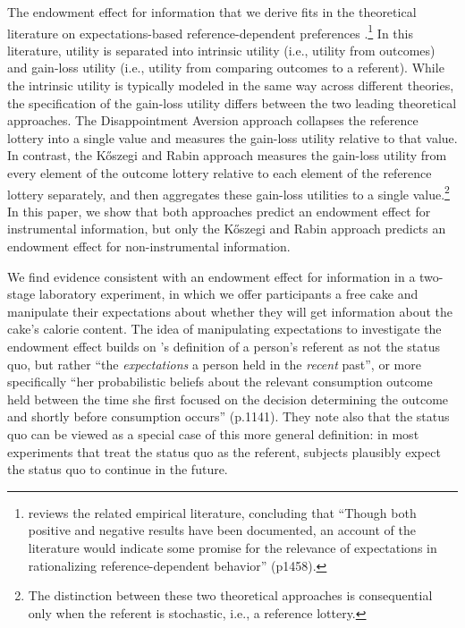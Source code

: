 The endowment effect for information that we derive fits in the theoretical literature on expectations-based reference-dependent preferences \citep{marzilliericsonEndowmentEffect2014,odonoghueChapterReferenceDependentPreferences2018}.\footnote{\citet{sprengerEndowmentEffectRisk2015} reviews the related empirical literature, concluding that \enquote{Though both positive and negative results have been documented, an account of the literature would indicate some promise for the relevance of expectations in rationalizing reference-dependent behavior} (p1458).} In this literature, utility is separated into intrinsic utility (i.e., utility from outcomes) and gain-loss utility (i.e., utility from comparing outcomes to a referent). While the intrinsic utility is typically modeled in the same way across different theories, the specification of the gain-loss utility differs between the two leading theoretical approaches. The Disappointment Aversion approach \citep{bellDisappointmentDecisionMaking1985,loomesDisappointmentDynamicConsistency1986,gulTheoryDisappointmentAversion1991} collapses the reference lottery into a single value and measures the gain-loss utility relative to that value. In contrast, the  Kőszegi and Rabin approach \citep{koszegiModelReferenceDependentPreferences2006,koszegiReferenceDependentRiskAttitudes2007} measures the gain-loss utility from every element of the outcome lottery relative to each element of the reference lottery separately, and then aggregates these gain-loss utilities to a single value.\footnote{The distinction between these two theoretical approaches is consequential only when the referent is stochastic, i.e., a reference lottery.}  In this paper, we show that both approaches predict an endowment effect for instrumental information, but only the Kőszegi and Rabin approach predicts an endowment effect for non-instrumental information.

We find evidence consistent with an endowment effect for information in a two-stage laboratory experiment, in which we offer participants a free cake and manipulate their expectations about whether they will get information about the cake’s calorie content. The idea of manipulating expectations to investigate the endowment effect builds on \citet{koszegiModelReferenceDependentPreferences2006}'s definition of a person’s referent as not the status quo, but rather \enquote{the \emph{expectations} a person held in the \emph{recent} past}, or more specifically \enquote{her probabilistic beliefs about the relevant consumption outcome held between the time she first focused on the decision determining the outcome and shortly before consumption occurs} (p.1141). They note also that the status quo can be viewed as a special case of this more general definition: in most experiments that treat the status quo as the referent, subjects plausibly expect the status quo to continue in the future.

